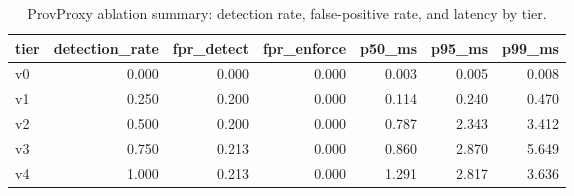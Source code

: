 \begin{table}[t]
\centering
\caption{ProvProxy ablation summary: detection rate, false-positive rate, and latency by tier.}
\label{tab:ablation_summary}
\begin{tabular}{lrrrrrr}
\toprule
tier & detection\_rate & fpr\_detect & fpr\_enforce & p50\_ms & p95\_ms & p99\_ms \\
\midrule
v0 & 0.000 & 0.000 & 0.000 & 0.003 & 0.005 & 0.008 \\
v1 & 0.250 & 0.200 & 0.000 & 0.114 & 0.240 & 0.470 \\
v2 & 0.500 & 0.200 & 0.000 & 0.787 & 2.343 & 3.412 \\
v3 & 0.750 & 0.213 & 0.000 & 0.860 & 2.870 & 5.649 \\
v4 & 1.000 & 0.213 & 0.000 & 1.291 & 2.817 & 3.636 \\
\bottomrule
\end{tabular}
\end{table}